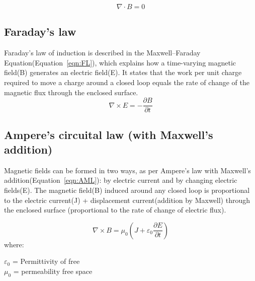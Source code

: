 \begin{equation}
\label{eqn:GML}
{\nabla} \cdot {B} = 0
\end{equation}


\subsection{Faraday's law}
Faraday's law of induction is described in the Maxwell–Faraday Equation(Equation~\ref{eqn:FL}), which explains how a time-varying magnetic field({B}) generates an electric field({E}). It states that the work per unit charge required to move a charge around a closed loop equals the rate of change of the magnetic flux through the enclosed surface.
\begin{equation}
\label{eqn:FL}
{\nabla} \times {E} = -\frac{\partial {B}}{\partial t}
\end{equation}

\subsection{Ampere's circuital law (with Maxwell's addition) }
Magnetic fields can be formed in two ways, as per Ampere's law with Maxwell's addition(Equation~\ref{eqn:AML}): by electric current and by changing electric fields({E}).
The magnetic field({B}) induced around any closed loop is proportional to the electric current({J}) + displacement current(addition by Maxwell) through the enclosed surface (proportional to the rate of change of electric flux). 

\begin{equation}
\label{eqn:AML}
{\nabla} \times {B} = \mu_0\left({J}+{\varepsilon_0}\frac{\partial {E}}{\partial t}\right)
\end{equation}
where:
\begin{center}
${\varepsilon_0}$ = Permittivity of free \\
$\mu_0$ =  permeability free space\\
\end{center}